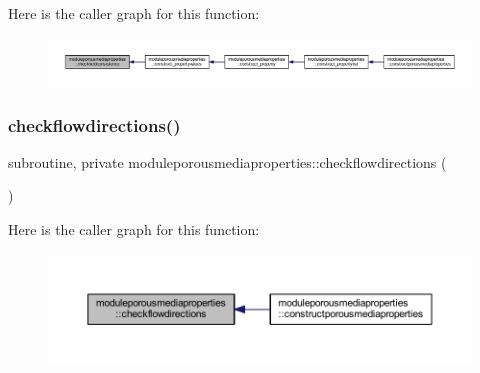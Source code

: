 Here is the caller graph for this function\+:\nopagebreak
\begin{figure}[H]
\begin{center}
\leavevmode
\includegraphics[width=350pt]{namespacemoduleporousmediaproperties_a2f7af623d77295c6b462fed30cf66e1b_icgraph}
\end{center}
\end{figure}
\mbox{\label{namespacemoduleporousmediaproperties_a63ce83aa045cf918fb7c8218fc07ff62}} 
\subsubsection{\texorpdfstring{checkflowdirections()}{checkflowdirections()}}
{\footnotesize\ttfamily subroutine, private moduleporousmediaproperties\+::checkflowdirections (\begin{DoxyParamCaption}{ }\end{DoxyParamCaption})\hspace{0.3cm}{\ttfamily [private]}}

Here is the caller graph for this function\+:\nopagebreak
\begin{figure}[H]
\begin{center}
\leavevmode
\includegraphics[width=350pt]{namespacemoduleporousmediaproperties_a63ce83aa045cf918fb7c8218fc07ff62_icgraph}
\end{center}
\end{figure}
\mbox{\label{namespacemoduleporousmediaproperties_aff227e766a06094629675d29f5f9e972}} 
